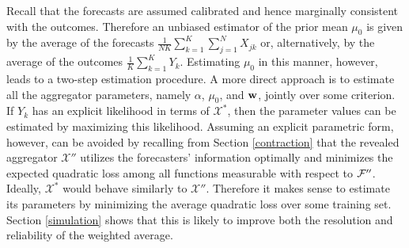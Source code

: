 \documentclass[11pt]{article}
\theoremstyle{definition}
\theoremstyle{definition}
\def\w{{\bf w}}
\def\F{{\cal F}}
\begin{document}
Recall that the forecasts are assumed calibrated and hence marginally consistent with the outcomes. Therefore an unbiased estimator of the prior mean $\mu_0$ is given by the average of the forecasts $\frac{1}{NK} \sum_{k=1}^K\sum_{j=1}^N X_{jk}$ or, alternatively, by the average of the outcomes $\frac{1}{K} \sum_{k=1}^K Y_k$. Estimating $\mu_0$ in this manner, however, leads to a two-step estimation procedure. A more direct approach is to estimate all the aggregator parameters, namely $\alpha$, $\mu_0$, and $\w$, jointly over some criterion. If $Y_k$ has an explicit likelihood in terms of $\mathcal{X}^*$, then the parameter values can be estimated by maximizing this likelihood. Assuming an explicit parametric form, however, can be avoided by recalling from Section \ref{contraction} that the revealed aggregator $\mathcal{X}''$ utilizes the forecasters' information optimally and minimizes the expected quadratic loss among all functions measurable with respect to $\F''$. Ideally, $\mathcal{X}^*$ would behave similarly to $\mathcal{X}''$. Therefore it makes sense to estimate its parameters by minimizing the average quadratic loss over some training set. Section \ref{simulation} shows that this is likely to improve both the resolution and reliability of the weighted average. 
\end{document}
